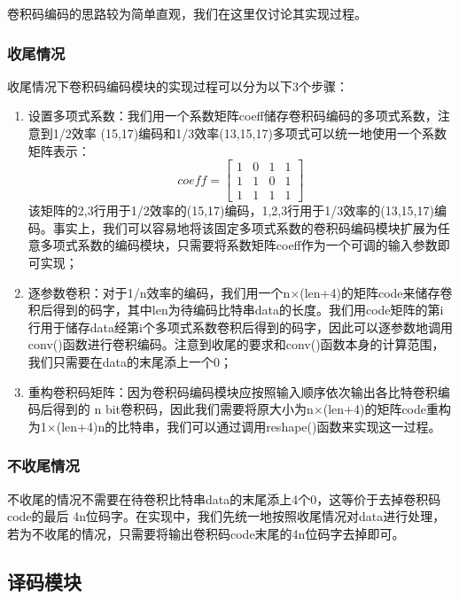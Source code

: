 卷积码编码的思路较为简单直观，我们在这里仅讨论其实现过程。

\subsubsection{收尾情况}

收尾情况下卷积码编码模块的实现过程可以分为以下3个步骤：

\begin{enumerate}
    \item 设置多项式系数：我们用一个系数矩阵coeff储存卷积码编码的多项式系数，注意到1/2效率 (15,17)编码和1/3效率(13,15,17)多项式可以统一地使用一个系数矩阵表示：
    \begin{equation*}
    coeff=\left[
        \begin{matrix}
            1 & 0 & 1 & 1\\
            1 & 1 & 0 & 1\\
            1 & 1 & 1 & 1
        \end{matrix}
    \right]
    \end{equation*}
    该矩阵的2,3行用于1/2效率的(15,17)编码，1,2,3行用于1/3效率的(13,15,17)编码。事实上，我们可以容易地将该固定多项式系数的卷积码编码模块扩展为任意多项式系数的编码模块，只需要将系数矩阵coeff作为一个可调的输入参数即可实现；
    \item 逐参数卷积：对于1/n效率的编码，我们用一个n$\times$(len+4)的矩阵code来储存卷积后得到的码字，其中len为待编码比特串data的长度。我们用code矩阵的第i行用于储存data经第i个多项式系数卷积后得到的码字，因此可以逐参数地调用conv()函数进行卷积编码。注意到收尾的要求和conv()函数本身的计算范围，我们只需要在data的末尾添上一个0；
    \item 重构卷积码矩阵：因为卷积码编码模块应按照输入顺序依次输出各比特卷积编码后得到的 n bit卷积码，因此我们需要将原大小为n$\times$(len+4)的矩阵code重构为1$\times$(len+4)n的比特串，我们可以通过调用reshape()函数来实现这一过程。
\end{enumerate}

\subsubsection{不收尾情况}

不收尾的情况不需要在待卷积比特串data的末尾添上4个0，这等价于去掉卷积码code的最后 4n位码字。在实现中，我们先统一地按照收尾情况对data进行处理，若为不收尾的情况，只需要将输出卷积码code末尾的4n位码字去掉即可。

\subsection{译码模块}

